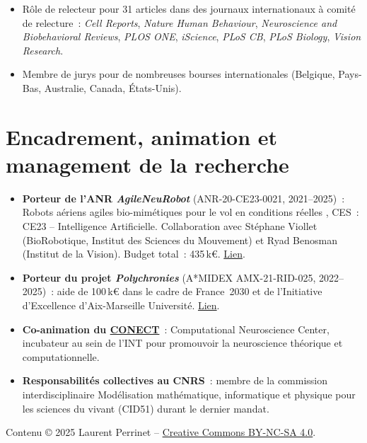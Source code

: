\documentclass[11pt,french,a4paper,oneside]{article}
\begin{document}
\begin{itemize}
    \item Rôle de relecteur pour 31 articles dans des journaux internationaux à comité de relecture~: \emph{Cell Reports}, \emph{Nature Human Behaviour}, \emph{Neuroscience and Biobehavioral Reviews}, \emph{PLOS ONE}, \emph{iScience}, \emph{PLoS CB}, \emph{PLoS Biology}, \emph{Vision Research}.
    \item Membre de jurys pour de nombreuses bourses internationales (Belgique, Pays-Bas, Australie, Canada, États-Unis).
\end{itemize}

\section{Encadrement, animation et management de la recherche}

\begin{itemize}
    \item \textbf{Porteur de l'ANR \textit{AgileNeuRobot}} (ANR-20-CE23-0021, 2021--2025)~: \og Robots aériens agiles bio-mimétiques pour le vol en conditions réelles \fg{}, CES~: CE23 -- Intelligence Artificielle. Collaboration avec Stéphane Viollet (BioRobotique, Institut des Sciences du Mouvement) et Ryad Benosman (Institut de la Vision). Budget total~: 435\,k\euro{}. \href{https://laurentperrinet.github.io/grant/anr-anr/}{Lien}.

    \item \textbf{Porteur du projet \textit{Polychronies}} (A*MIDEX AMX-21-RID-025, 2022--2025)~: aide de 100\,k\euro{} dans le cadre de France~2030 et de l'Initiative d'Excellence d'Aix-Marseille Université. \href{https://laurentperrinet.github.io/grant/polychronies/}{Lien}.

    \item \textbf{Co-animation du \href{https://conect-int.github.io/}{CONECT}}~: Computational Neuroscience Center, incubateur au sein de l'INT pour promouvoir la neuroscience théorique et computationnelle.

    \item \textbf{Responsabilités collectives au CNRS}~: membre de la commission interdisciplinaire \og Modélisation mathématique, informatique et physique pour les sciences du vivant \fg{} (CID51) durant le dernier mandat.
\end{itemize}

\medskip
\noindent\small Contenu \copyright{} 2025 Laurent Perrinet -- \href{https://creativecommons.org/licenses/by-nc-sa/4.0/}{Creative Commons BY-NC-SA 4.0}.
\end{document}
